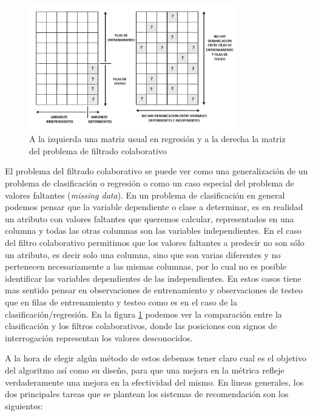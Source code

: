 \documentclass[hidelinks,12pt,a4paper]{book}
\theoremstyle{plain}
\theoremstyle{definition}
\begin{document}
\begin{figure}[ht]
\centering
\includegraphics[width=0.8\textwidth]{CFvsRegresion.png}
\caption{A la izquierda una matriz usual en regresión y a la derecha la matriz del problema de filtrado colaborativo}\label{fig:CFvsReg}
\end{figure}

El problema del filtrado colaborativo se puede ver como una generalización de un problema de clasificación o regresión\cite{agg} \cite{cacheda2011comparison} \cite{vucetic2005collaborative} o como un caso especial del problema de valores faltantes (\textit{missing data}). En un problema de clasificación en general podemos pensar que la variable dependiente o clase a determinar, es en realidad un atributo con valores faltantes que queremos calcular, representados en una columna y todas las otras columnas son las variables independientes. En el caso del filtro colaborativo permitimos que los valores faltantes a predecir no son sólo un atributo, es decir solo una columna, sino que son varias diferentes y no pertenecen necesariamente a las mismas columnas, por lo cual no es posible identificar las variables dependientes de las independientes. En estos casos tiene mas sentido pensar en observaciones de entrenamiento y observaciones de testeo que en filas de entrenamiento y testeo como es en el caso de la clasificación/regresión. En la figura \ref{fig:CFvsReg} podemos ver la comparación entre la clasificación y los filtros colaborativos, donde las posiciones con signos de interrogación representan los valores desconocidos.

A la hora de elegir algún método de estos debemos tener claro cual es el objetivo del algoritmo así como su diseño, para que una mejora en la métrica refleje verdaderamente una mejora en la efectividad del mismo. En lineas generales, los dos principales tareas que se plantean los sistemas de recomendación son los siguientes:
\end{document}
